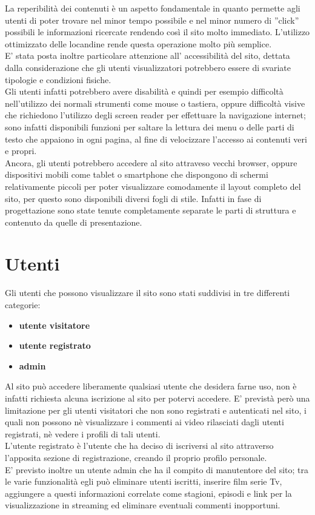 \n La reperibilità dei contenuti è un aspetto fondamentale in quanto permette agli utenti di poter trovare nel minor tempo possibile e nel minor numero di ''click'' possibili le informazioni ricercate rendendo così il sito molto immediato. L'utilizzo ottimizzato delle locandine rende questa operazione molto più semplice.\\
\n E' stata posta inoltre particolare attenzione all' accessibilità del sito, dettata dalla considerazione che gli utenti visualizzatori potrebbero essere di svariate tipologie e condizioni fisiche.\\
Gli utenti infatti potrebbero avere disabilità e quindi per esempio difficoltà nell'utilizzo dei normali strumenti come mouse o tastiera, oppure difficoltà visive che richiedono l'utilizzo degli screen reader per effettuare la navigazione internet; sono infatti disponibili funzioni per saltare la lettura dei menu o delle parti di testo che appaiono in ogni pagina, al fine di velocizzare l'accesso ai contenuti veri e propri.\\
Ancora, gli utenti potrebbero accedere al sito attraveso vecchi browser, oppure dispositivi mobili come tablet o smartphone che dispongono di schermi relativamente piccoli per poter visualizzare comodamente il layout completo del sito, per questo sono disponibili diversi fogli di stile. Infatti in fase di progettazione sono state tenute completamente separate le parti di struttura e contenuto da quelle di presentazione. \\


\section{Utenti}
Gli utenti che possono visualizzare il sito sono stati suddivisi in tre differenti categorie:
\begin{itemize}
\item \textbf{utente visitatore}
\item \textbf{utente registrato}
\item \textbf{admin}
\end{itemize}

\n Al sito può accedere liberamente qualsiasi utente che desidera farne uso, non è infatti richiesta alcuna iscrizione al sito per potervi accedere. E' previstà però una limitazione per gli utenti visitatori che non sono registrati e autenticati nel sito, i quali non possono nè visualizzare i commenti ai video rilasciati dagli utenti registrati, nè vedere i profili di tali utenti.\\
L'utente registrato è l'utente che ha deciso di iscriversi al sito attraverso l'apposita sezione di registrazione, creando il proprio profilo personale.\\
E' previsto inoltre un utente admin che ha il compito di manutentore del sito; tra le varie funzionalità egli può eliminare utenti iscritti, inserire film serie Tv, aggiungere a questi informazioni correlate come stagioni, episodi e link per la visualizzazione in streaming ed eliminare eventuali commenti inopportuni.



